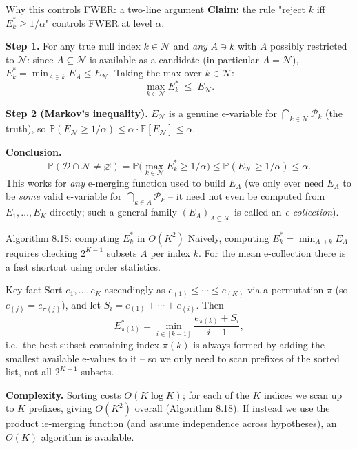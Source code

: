 \documentclass[aspectratio=169,10pt]{beamer}
\newcommand{\E}{\mathbb{E}}
\newcommand{\Pb}{\mathbb{P}}
\newcommand{\calK}{\mathcal{K}}
\newcommand{\calP}{\mathcal{P}}
\newcommand{\calN}{\mathcal{N}}
\begin{document}
\begin{frame}{Why this controls FWER: a two-line argument}
  \textbf{Claim:} the rule "reject $k$ iff $E_k^\ast \geq 1/\alpha$" controls FWER at level $\alpha$.

  \vspace{0.2cm}
  \textbf{Step 1.} For any true null index $k \in \calN$ and \emph{any} $A \ni k$ with $A$ possibly restricted to $\calN$: since $A \subseteq \calN$ is available as a candidate (in particular $A = \calN$), $E_k^\ast = \min_{A \ni k} E_A \leq E_\calN$. Taking the max over $k \in \calN$:
  \[
    \max_{k \in \calN} E_k^\ast \;\leq\; E_\calN.
  \]

  \textbf{Step 2 (Markov's inequality).} $E_\calN$ is a genuine e-variable for $\bigcap_{k\in\calN}\calP_k$ (the truth), so $\Pb(E_\calN \geq 1/\alpha) \leq \alpha \cdot \E[E_\calN] \leq \alpha$.

  \textbf{Conclusion.}
  \[
    \Pb(\mathcal D \cap \calN \neq \varnothing) = \Pb\Big(\max_{k \in \calN} E_k^\ast \geq 1/\alpha\Big) \leq \Pb(E_\calN \geq 1/\alpha) \leq \alpha.
  \]
  This works for \emph{any} e-merging function used to build $E_A$ (we only ever need $E_A$ to be \emph{some} valid e-variable for $\bigcap_{k\in A}\calP_k$ -- it need not even be computed from $E_1,\dots,E_K$ directly; such a general family $(E_A)_{A\subseteq\calK}$ is called an \emph{e-collection}).
\end{frame}

\begin{frame}{Algorithm 8.18: computing $E_k^\ast$ in $O(K^2)$}
  Naively, computing $E_k^\ast=\min_{A\ni k}E_A$ requires checking $2^{K-1}$ subsets $A$ per index $k$. For the mean e-collection there is a fast shortcut using order statistics.

  \begin{block}{Key fact}
    Sort $e_1,\dots,e_K$ ascendingly as $e_{(1)} \leq \cdots \leq e_{(K)}$ via a permutation $\pi$ (so $e_{(j)} = e_{\pi(j)}$), and let $S_i = e_{(1)}+\cdots+e_{(i)}$. Then
    \[
      E^\ast_{\pi(k)} = \min_{i \in [k-1]} \frac{e_{\pi(k)} + S_i}{i+1},
    \]
    i.e.\ the best subset containing index $\pi(k)$ is always formed by adding the smallest available e-values to it -- so we only need to scan prefixes of the sorted list, not all $2^{K-1}$ subsets.
  \end{block}
  \textbf{Complexity.} Sorting costs $O(K\log K)$; for each of the $K$ indices we scan up to $K$ prefixes, giving $O(K^2)$ overall (Algorithm 8.18). If instead we use the product ie-merging function (and assume independence across hypotheses), an $O(K)$ algorithm is available.
\end{frame}
\end{document}

